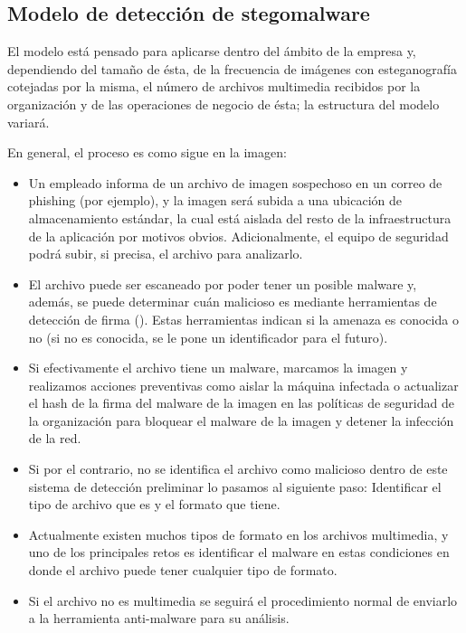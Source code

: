 \subsection{Modelo de detección de stegomalware}

El modelo está pensado para aplicarse dentro del ámbito de la empresa y, dependiendo del tamaño de ésta, de la frecuencia de imágenes con esteganografía cotejadas por la misma, el número de archivos multimedia recibidos por la organización y de las operaciones de negocio de ésta; la estructura del modelo variará.

En general, el proceso es como sigue en la imagen:


\begin{itemize}
\item Un empleado informa de un archivo de imagen sospechoso en un correo de phishing (por ejemplo), y la imagen será subida a una ubicación de almacenamiento estándar, la cual está aislada del resto de la infraestructura de la aplicación por motivos obvios. Adicionalmente, el equipo de seguridad podrá subir, si precisa, el archivo para analizarlo.
\item El archivo puede ser escaneado por poder tener un posible malware y, además, se puede determinar cuán malicioso es mediante herramientas de detección de firma (\cite{signature-based-detection}). Estas herramientas indican si la amenaza es conocida o no (si no es conocida, se le pone un identificador para el futuro). %
\item Si efectivamente el archivo tiene un malware, marcamos la imagen y realizamos acciones preventivas como aislar la máquina infectada o actualizar el hash de la firma del malware de la imagen en las políticas de seguridad de la organización para bloquear el malware de la imagen y detener la infección de la red.
\item Si por el contrario, no se identifica el archivo como malicioso dentro de este sistema de detección preliminar lo pasamos al siguiente paso: Identificar el tipo de archivo que es y el formato que tiene.
\item Actualmente existen muchos tipos de formato en los archivos multimedia, y uno de los principales retos es identificar el malware en estas condiciones en donde el archivo puede tener cualquier tipo de formato.
\item Si el archivo no es multimedia se seguirá el procedimiento normal de enviarlo a la herramienta anti-malware para su análisis.

\end{itemize}
